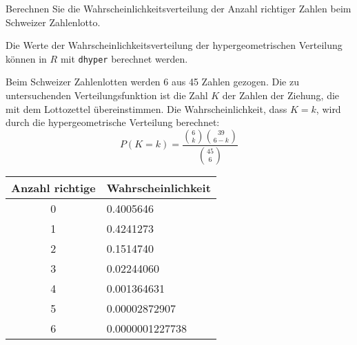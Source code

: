 Berechnen Sie die Wahrscheinlichkeitsverteilung der Anzahl
richtiger Zahlen beim Schweizer Zahlenlotto.

\begin{hinweis}
Die Werte der Wahrscheinlichkeitsverteilung
der hypergeometrischen Verteilung können
in $R$ mit {\tt dhyper} berechnet werden.
\end{hinweis}


\begin{loesung}
Beim Schweizer Zahlenlotten werden 6 aus 45 Zahlen
gezogen. Die zu untersuchenden Verteilungsfunktion ist die
Zahl $K$ der Zahlen der Ziehung, die mit dem Lottozettel
übereinstimmen.
Die Wahrscheinlichkeit, dass $K=k$,
wird durch die hypergeometrische Verteilung berechnet:
\[
P(K=k)=\frac{\binom{6}{k}\binom{39}{6-k}}{\binom{45}{6}}
\]
\begin{center}
\begin{tabular}{|c|l|}
\hline
Anzahl richtige&Wahrscheinlichkeit\\
\hline
0& 0.4005646\\
1& 0.4241273\\
2& 0.1514740\\
3& 0.02244060\\
4& 0.001364631\\
5& 0.00002872907\\
6& 0.0000001227738\\
\hline
\end{tabular}
\end{center}
\end{loesung}

